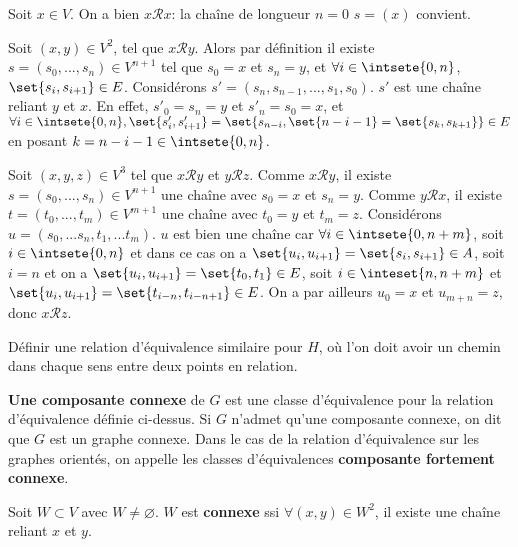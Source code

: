 \documentclass{scrartcl}
\begin{document}
			\begin{demo}
				\item Soit $x \in V$. On a bien $x\mathcal{R}x$: la chaîne de longueur $n=0$ $s = (x)$ convient.
				\item Soit $(x,y) \in V^2$, tel que $x \mathcal{R}y$. 
					Alors par définition il existe $s = (s_0,...,s_n) \in V^{n+1}$ tel que $s_0 = x$ et $s_n = y$,
					et $\forall i \in \intsete{0,n}$, $\set{s_i,s_{i+1}} \in E$.
					Considérons $s' = (s_n,s_{n-1},...,s_1,s_0)$. $s'$ est une chaîne reliant $y$ et $x$.
					En effet, $s'_0 = s_n = y$ et $s'_n = s_0 = x$, et $\forall i \in \intsete{0,n}, 
					\set{s'_{i},s'_{i+1}} = \set{s_{n-i},\set{n-i-1} = \set{s_k,s_{k+1}}} \in E$ en posant $k = n-i-1 \in \intsete{0,n}$.
				\item Soit $(x,y,z) \in V^3$ tel que $x\mathcal{R}y$ et $y\mathcal{R}z$.
					Comme $x\mathcal{R}y$, il existe $s = (s_0,...,s_n) \in V^{n+1}$ une chaîne avec $s_0 = x$ et $s_n = y$.
					Comme $y\mathcal{R}x$, il existe $t = (t_0,...,t_m) \in V^{m+1}$ une chaîne avec $t_0 = y$ et $t_m = z$.
					Considérons $u = (s_0,...s_n,t_1,...t_m)$.
					$u$ est bien une chaîne car $\forall i \in \intsete{0,n+m}$, soit $i \in \intsete{0,n}$ et dans ce cas on a 
					$\set{u_i, u_{i+1}} = \set{s_i,s_{i+1}} \in A$, soit $i = n$ et on a $\set{u_i,u_{i+1}} = \set{t_0,t_1} \in E$,
					soit $i \in \inteset{n,n+m}$ et $\set{u_i,u_{i+1}} = \set{t_{i-n},t_{i-n+1}} \in E$.
					On a par ailleurs $u_0 = x$ et $u_{m+n} = z$, donc $x\mathcal{R}z$.
			\end{demo}

			\exo Définir une relation d'équivalence similaire pour $H$, où l'on doit avoir un chemin dans chaque sens entre deux points en relation.

			 \textbf{Une composante connexe} de $G$ est une classe d'équivalence pour la relation d'équivalence définie ci-dessus.
			Si $G$ n'admet qu'une composante connexe, on dit que $G$ est un graphe connexe. 
			Dans le cas de la relation d'équivalence sur les graphes orientés, on appelle les classes d'équivalences \textbf{composante fortement connexe}.

			 Soit $W \subset V$ avec $W \neq \varnothing$. 
			$W$ est \textbf{connexe} ssi $\forall(x,y) \in W^2$, il existe une chaîne reliant $x$ et $y$.

\end{document}
